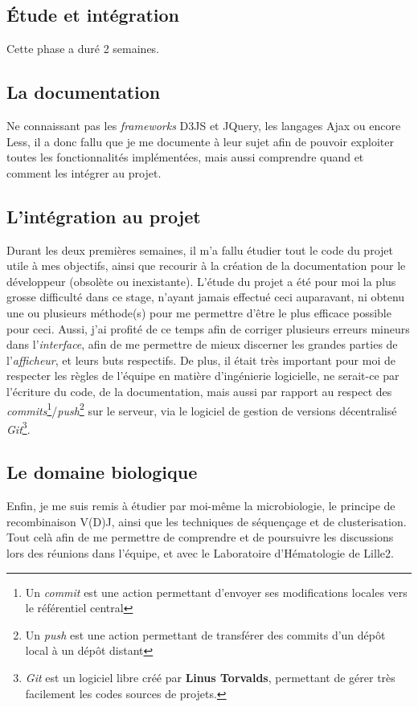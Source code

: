 \documentclass[pdftex,12pt,a4paper]{report}
\begin{document}
\begin{spacing}{1.2}
\section{Étude et intégration}

Cette phase a duré 2 semaines.

\subsection{La documentation}
Ne connaissant pas les \textit{frameworks} D3JS et JQuery, les langages Ajax ou encore Less, il a donc fallu que je me documente à leur sujet afin de pouvoir exploiter toutes les fonctionnalités implémentées, mais aussi comprendre quand et comment les intégrer au projet.

\subsection{L'intégration au projet}
Durant les deux premières semaines, il m'a fallu étudier tout le code du projet utile à mes objectifs, ainsi que recourir à la création de la documentation pour le développeur (obsolète ou inexistante). L'étude du projet a été pour moi la plus grosse difficulté dans ce stage, n'ayant jamais effectué ceci auparavant, ni obtenu une ou plusieurs méthode(s) pour me permettre d'être le plus efficace possible pour ceci. Aussi, j'ai profité de ce temps afin de corriger plusieurs erreurs mineurs dans l'\textit{interface}, afin de me permettre de mieux discerner les grandes parties de l'\textit{afficheur}, et leurs buts respectifs.
\newline
De plus, il était très important pour moi de respecter les règles de l'équipe en matière d'ingénierie logicielle, ne serait-ce par l'écriture du code, de la documentation, mais aussi par rapport au respect des \textit{commits}\footnote{Un \textit{commit} est une action permettant d'envoyer ses modifications locales vers le référentiel central}/\textit{push}\footnote{Un \textit{push} est une action permettant de transférer des commits d'un dépôt local à un dépôt distant} sur le serveur, via le logiciel de gestion de versions décentralisé \textit{Git}\footnote{\textit{Git} est un logiciel libre créé par \textbf{Linus Torvalds}, permettant de gérer très facilement les codes sources de projets.}.

\subsection{Le domaine biologique}
Enfin, je me suis remis à étudier par moi-même la microbiologie, le principe de recombinaison V(D)J, ainsi que les techniques de séquençage et de clusterisation. Tout celà afin de me permettre de comprendre et de poursuivre les discussions lors des réunions dans l'équipe, et avec le Laboratoire d'Hématologie de Lille2.


\end{spacing}
\end{document}
